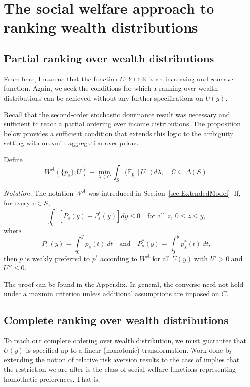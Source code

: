 \documentclass[Chp3.tex]{subfiles}
\begin{document}
\section{The social welfare approach to ranking wealth distributions}
\label{sec:SWFapproach}

\subsection{Partial ranking over wealth distributions}

\par From here, I assume that the function $U: Y \mapsto \mathbb{R}$ is an increasing and concave function. Again, we seek the conditions for which a ranking over wealth distributions can be achieved without any further specifications on $U(y)$.

\par Recall that the second-order stochastic dominance result was necessary and sufficient to reach a partial ordering over income distributions. The proposition below provides a sufficient condition that extends this logic to the ambiguity setting with maxmin aggregation over priors.

\begin{prop}
Define
\[
W^{A}(\{p_s\};U) \equiv \min_{\lambda \in C} \int_{S} \big(\mathbb{E}_{p_s}[U]\big)\, d\lambda,
\quad C \subseteq \Delta(S).
\]
\par \textit{Notation.} The notation $W^{A}$ was introduced in Section~\ref{sec:ExtendedModel}.
If, for every $s \in S$,
\[
\int_{0}^{z} \left[P_{s}(y) - P^{*}_{s}(y)\right] dy \leq 0
\quad \text{for all } z,\; 0 \leq z \leq \bar{y},
\]
where
\[
P_s(y) = \int_{0}^{y} p_s(t)\,dt
\quad \text{and} \quad
P_s^*(y) = \int_{0}^{y} p_s^*(t)\,dt,
\]
then $p$ is weakly preferred to $p^*$ according to $W^{A}$ for all $U(y)$ with $U' > 0$ and $U'' \leq 0$.
\end{prop}


\par The proof can be found in the Appendix. In general, the converse need not hold under a maxmin criterion unless additional assumptions are imposed on $C$.

\subsection{Complete ranking over wealth distributions}

\par To reach our complete ordering over wealth distribution, we must guarantee that $U(y)$ is specified up to a linear (monotonic) transformation. Work done by \cite{rklm81} extending the notion of relative risk aversion results to the case of  implies that the restriction we are after is the class of social welfare functions representing homothetic preferences. That is,
\end{document}
